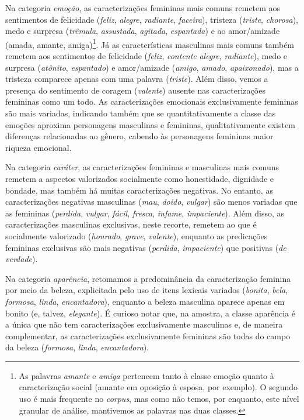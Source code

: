 \documentclass[portuguese]{textolivre}
\begin{document}
Na categoria \textit{emoção}, as caracterizações femininas mais comuns remetem aos sentimentos de felicidade (\textit{feliz}, \textit{alegre}, \textit{radiante}, \textit{faceira}), tristeza (\textit{triste}, \textit{chorosa}), medo e surpresa (\textit{trêmula}, \textit{assustada}, \textit{agitada}, \textit{espantada}) e ao amor/amizade (amada, amante, amiga)\footnote{As palavras \textit{amante} e \textit{amiga} pertencem tanto à classe emoção quanto à caracterização social (amante em oposição à esposa, por exemplo). O segundo uso é mais frequente no \textit{corpus}, mas como não temos, por enquanto, este nível granular de análise, mantivemos as palavras nas duas classes.}. Já as características masculinas mais comuns também remetem aos sentimentos de felicidade (\textit{feliz}, \textit{contente} \textit{alegre}, \textit{radiante}), medo e surpresa (\textit{atônito}, \textit{espantado}) e amor/amizade (\textit{amigo}, \textit{amado}, \textit{apaixonado}), mas a tristeza comparece apenas com uma palavra (\textit{triste}). Além disso, vemos a presença do sentimento de coragem (\textit{valente}) ausente nas caracterizações femininas como um todo. As caracterizações emocionais exclusivamente femininas são mais variadas, indicando também que se quantitativamente a classe das emoções aproxima personagens masculinas e femininas, qualitativamente existem diferenças relacionadas ao gênero, cabendo às personagens femininas maior riqueza emocional.

Na categoria \textit{caráter}, as caracterizações femininas e masculinas mais comuns remetem a aspectos valorizados socialmente como honestidade, dignidade e bondade, mas também há muitas caracterizações negativas. No entanto, as caracterizações negativas masculinas (\textit{mau}, \textit{doido}, \textit{vulgar}) são menos variadas que as femininas (\textit{perdida}, \textit{vulgar}, \textit{fácil}, \textit{fresca}, \textit{infame}, \textit{impaciente}). Além disso, as caracterizações masculinas exclusivas, neste recorte, remetem ao que é socialmente valorizado (\textit{honrado}, \textit{grave}, \textit{valente}), enquanto as predicações femininas exclusivas são mais negativas (\textit{perdida}, \textit{impaciente}) que positivas (\textit{de verdade}).

Na categoria \textit{aparência}, retomamos a predominância da caracterização feminina por meio da beleza, explicitada pelo uso de itens lexicais variados (\textit{bonita}, \textit{bela}, \textit{formosa}, \textit{linda}, \textit{encantadora}), enquanto a beleza masculina aparece apenas em bonito (e, talvez, \textit{elegante}). É curioso notar que, na amostra, a classe aparência é a única que não tem caracterizações exclusivamente masculinas e, de maneira complementar, as caracterizações exclusivamente femininas são todas do campo da beleza (\textit{formosa}, \textit{linda}, \textit{encantadora}).
\end{document}
